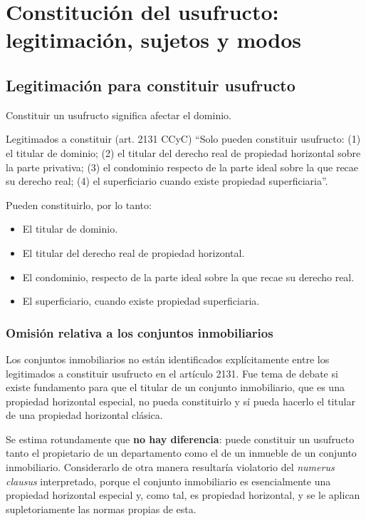 \documentclass[12pt,oneside]{book}
\begin{document}
\chapter[Constitución del usufructo]{Constitución del usufructo: legitimación, sujetos y modos}

\section{Legitimación para constituir usufructo}

Constituir un usufructo significa afectar el dominio.

\begin{definition}{Legitimados a constituir (art. 2131 CCyC)}
``Solo pueden constituir usufructo: (1) el titular de dominio; (2) el titular del derecho real de propiedad horizontal sobre la parte privativa; (3) el condominio respecto de la parte ideal sobre la que recae su derecho real; (4) el superficiario cuando existe propiedad superficiaria''.
\end{definition}

Pueden constituirlo, por lo tanto:

\begin{itemize}
    \item El titular de dominio.
    \item El titular del derecho real de propiedad horizontal.
    \item El condominio, respecto de la parte ideal sobre la que recae su derecho real.
    \item El superficiario, cuando existe propiedad superficiaria.
\end{itemize}

\subsection{Omisión relativa a los conjuntos inmobiliarios}

Los conjuntos inmobiliarios no están identificados explícitamente entre los legitimados a constituir usufructo en el artículo 2131. Fue tema de debate si existe fundamento para que el titular de un conjunto inmobiliario, que es una propiedad horizontal especial, no pueda constituirlo y sí pueda hacerlo el titular de una propiedad horizontal clásica.

Se estima rotundamente que \textbf{no hay diferencia}: puede constituir un usufructo tanto el propietario de un departamento como el de un inmueble de un conjunto inmobiliario. Considerarlo de otra manera resultaría violatorio del \textit{numerus clausus} interpretado, porque el conjunto inmobiliario es esencialmente una propiedad horizontal especial y, como tal, es propiedad horizontal, y se le aplican supletoriamente las normas propias de esta.
\end{document}
